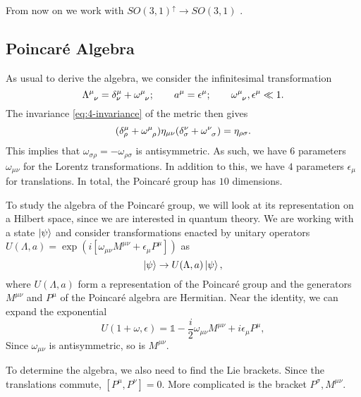 From now on we work with $SO(3, 1)^{\uparrow} \to SO(3, 1)$ .

\subsection{Poincaré Algebra}%
\label{sub:poincare_algebra}

As usual to derive the algebra, we consider the infinitesimal transformation
\begin{equation}
  \Lambda\indices{^{\mu}_{\nu}} = \delta^{\mu}_{\nu} + \omega\indices{^{\mu}_{\nu}}; \qquad a^{\mu} = \epsilon^{\mu}; \qquad \omega\indices{^{\mu}_{\nu}}, \epsilon^{\mu} \ll 1.
\end{equation}
The invariance \eqref{eq:4-invariance} of the metric then gives
\begin{equation}
  (\delta^{\mu}_{\rho} + \omega\indices{^{\mu}_{\rho}}) \eta_{\mu\nu} (\delta^{\nu}_{\sigma} + \omega\indices{^{\nu}_{\sigma}}) = \eta_{\rho\sigma}.
\end{equation}
This implies that $\omega_{\sigma\rho}= -\omega_{\rho\sigma}$ is antisymmetric.
As such, we have $6$ parameters $\omega_{\mu\nu}$ for the Lorentz transformations.
In addition to this, we have $4$ parameters $\epsilon_{\mu}$ for translations. In total, the Poincaré group has $10$ dimensions.

To study the algebra of the Poincaré group, we will look at its representation on a Hilbert space, since we are interested in quantum theory.
We are working with a state $\ket{\psi}$ and consider transformations enacted by unitary operators $U(\Lambda, a) = \exp(i [\omega_{\mu\nu} M^{\mu\nu} + \epsilon_{\mu} P^{\mu}])$ as
\begin{equation}
  \ket{\psi} \to U(\Lambda, a) \ket{\psi},
\end{equation}
where $U(\Lambda, a)$ form a representation of the Poincaré group and the generators $M^{\mu\nu}$ and $P^{\mu}$ of the Poincaré algebra are Hermitian.
Near the identity, we can expand the exponential
\begin{equation}
  U(1 + \omega, \epsilon) = \mathbb{1} - \frac{i}{2} \omega_{\mu\nu} M^{\mu\nu} + i \epsilon_{\mu} P^{\mu},
\end{equation}
Since $\omega_{\mu\nu}$ is antisymmetric, so is $M^{\mu\nu}$.

To determine the algebra, we also need to find the Lie brackets.
Since the translations commute, $[P^{\mu}, P^{\nu}] = 0$.
More complicated is the bracket $P^{\sigma}, M^{\mu\nu}$.

